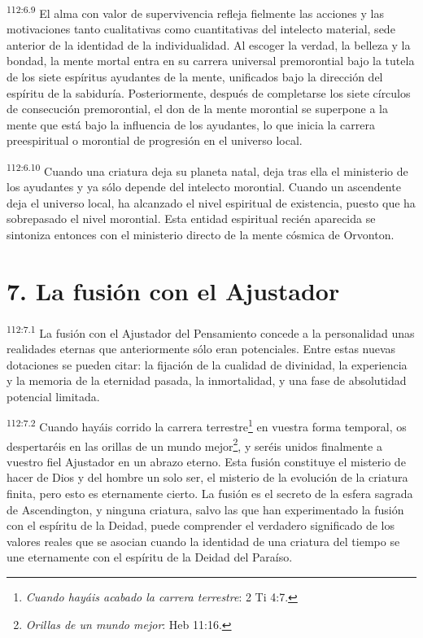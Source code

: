 \par
\textsuperscript{112:6.9} El alma con valor de supervivencia refleja fielmente las acciones y las motivaciones tanto cualitativas como cuantitativas del intelecto material, sede anterior de la identidad de la individualidad. Al escoger la verdad, la belleza y la bondad, la mente mortal entra en su carrera universal premorontial bajo la tutela de los siete espíritus ayudantes de la mente, unificados bajo la dirección del espíritu de la sabiduría. Posteriormente, después de completarse los siete círculos de consecución premorontial, el don de la mente morontial se superpone a la mente que está bajo la influencia de los ayudantes, lo que inicia la carrera preespiritual o morontial de progresión en el universo local.

\par
\textsuperscript{112:6.10} Cuando una criatura deja su planeta natal, deja tras ella el ministerio de los ayudantes y ya sólo depende del intelecto morontial. Cuando un ascendente deja el universo local, ha alcanzado el nivel espiritual de existencia, puesto que ha sobrepasado el nivel morontial. Esta entidad espiritual recién aparecida se sintoniza entonces con el ministerio directo de la mente cósmica de Orvonton.

\section*{7. La fusión con el Ajustador}
\par
\textsuperscript{112:7.1} La fusión con el Ajustador del Pensamiento concede a la personalidad unas realidades eternas que anteriormente sólo eran potenciales. Entre estas nuevas dotaciones se pueden citar: la fijación de la cualidad de divinidad, la experiencia y la memoria de la eternidad pasada, la inmortalidad, y una fase de absolutidad potencial limitada.

\par
\textsuperscript{112:7.2} Cuando hayáis corrido la carrera terrestre\footnote{\textit{Cuando hayáis acabado la carrera terrestre}: 2 Ti 4:7.} en vuestra forma temporal, os despertaréis en las orillas de un mundo mejor\footnote{\textit{Orillas de un mundo mejor}: Heb 11:16.}, y seréis unidos finalmente a vuestro fiel Ajustador en un abrazo eterno. Esta fusión constituye el misterio de hacer de Dios y del hombre un solo ser, el misterio de la evolución de la criatura finita, pero esto es eternamente cierto. La fusión es el secreto de la esfera sagrada de Ascendington, y ninguna criatura, salvo las que han experimentado la fusión con el espíritu de la Deidad, puede comprender el verdadero significado de los valores reales que se asocian cuando la identidad de una criatura del tiempo se une eternamente con el espíritu de la Deidad del Paraíso.

